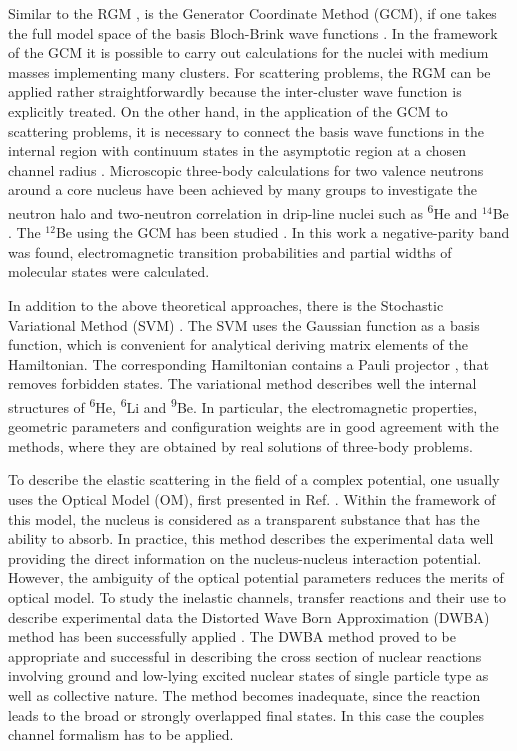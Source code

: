 \documentclass[
12pt, %
oneside, %
english, %
onehalfspacing, %
onehalfspacing, %
headsepline, %
]{MastersDoctoralThesis} %
\newcommand{\he}{\textsuperscript{6}He\xspace}
\newcommand{\li}{\textsuperscript{6}Li\xspace}
\newcommand{\be}{\textsuperscript{9}Be\xspace}
\begin{document}
Similar to the RGM \cite{horiuchi1970generator}, is the Generator Coordinate Method (GCM), if one takes the full model space of the basis Bloch-Brink wave functions \cite{brink1966proceedings}. 
In the framework of the GCM it is possible to carry out calculations for the nuclei with medium masses implementing many clusters. 
For scattering problems, the RGM can be applied rather straightforwardly because the inter-cluster wave function is explicitly treated. On the other hand, in the application of the GCM to scattering problems, it is necessary to connect the basis wave functions in the internal region with continuum states in the asymptotic region at a chosen channel radius \cite{descouvemont2010r}. 
 Microscopic three-body calculations for two valence neutrons around a core nucleus have been achieved by many groups to investigate the neutron halo and two-neutron correlation in drip-line nuclei such as \he and $^{14}$Be \cite{arai1999structure, descouvemont1995halo}. 
 The $^{12}$Be using the GCM has been studied \cite{descouvemont200112be}. 
 In this work a negative-parity band was found, electromagnetic transition probabilities and partial widths of molecular states were calculated.
 

In addition to the above theoretical approaches, there is the Stochastic Variational Method (SVM) \cite{kukulin1977stochastic, voronchev1994study, kukulin1986detailed, kukulin1984detailed}. 
The SVM uses the Gaussian function as a basis function, which is convenient for analytical deriving matrix elements of the Hamiltonian. 
The corresponding Hamiltonian contains a Pauli projector \cite{kukulin1978orthogonal}, that removes forbidden states. 
The variational method describes well the internal structures of \he, \li and \be \cite{kukulin1984detailed, kukulin1986detailed, voronchev1994study}. 
In particular, the electromagnetic properties, geometric parameters and configuration weights are in good agreement with the methods, where they are obtained by real solutions of three-body problems. 

To describe the elastic scattering in the field of a complex potential, one usually uses the Optical Model (OM), first presented in Ref. \cite{feshbach1958optical}. Within the framework of this model, the nucleus is considered as a transparent substance that has the ability to absorb. In practice, this method describes the experimental data well providing the direct information on the nucleus-nucleus interaction potential.
However, the ambiguity of the optical potential parameters reduces the merits of optical model.
To study the inelastic channels, transfer reactions and their use to describe experimental data the Distorted Wave Born Approximation (DWBA) method has been successfully applied \cite{satchler1960gamma}.
The DWBA method proved to be appropriate and successful in describing the cross section of nuclear reactions involving ground and low-lying excited nuclear states of single particle type as well as collective nature.
The method becomes inadequate, since the reaction leads to the broad or strongly overlapped final states.
In this case the couples channel formalism has to be applied.
\end{document}
